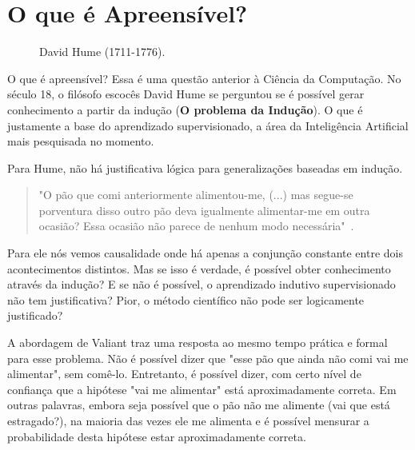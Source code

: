 \documentclass[
10pt, %
a4paper, %
onecolumn, %
]{article}
\begin{document}
\pagestyle{myheadings} %
\markright{\papertitle} %


\thispagestyle{plain} %

\printtitle %


\section{O que é Apreensível?}
\begin{figure}
    \caption{David Hume (1711-1776).}
    \label{hume}
\end{figure}

O que é apreensível? Essa é uma questão anterior à Ciência da Computação.  No século 18, o filósofo escocês David Hume se perguntou se é possível gerar conhecimento a partir da indução (\textbf{O problema da Indução})\cite{Hume2009Tratado}.  O que é justamente a base do aprendizado supervisionado, a área da Inteligência Artificial mais pesquisada no momento.

Para Hume, não há justificativa lógica para generalizações baseadas em indução. 
\begin{quotation}
    "O pão que comi anteriormente alimentou-me, (...) mas segue-se porventura disso outro pão deva igualmente alimentar-me em outra ocasião?  Essa ocasião não parece de nenhum modo necessária"~\cite{hume2004investigacoes}.
\end{quotation}
Para ele nós vemos causalidade onde há apenas a conjunção constante entre dois acontecimentos distintos. Mas se isso é verdade, é possível obter conhecimento através da indução?  E se não é possível, o aprendizado indutivo supervisionado não tem justificativa? Pior, o método científico não pode ser logicamente justificado?

A abordagem de Valiant traz uma resposta ao mesmo tempo prática e formal para esse problema.  Não é possível dizer que "esse pão que ainda não comi vai me alimentar", sem comê-lo. Entretanto, é possível dizer, com certo nível de confiança que a hipótese "vai me alimentar" está aproximadamente correta. Em outras palavras, embora seja possível que o pão não me alimente (vai que está estragado?), na maioria das vezes ele me alimenta e é possível mensurar a probabilidade desta hipótese estar aproximadamente correta. 
\end{document}
